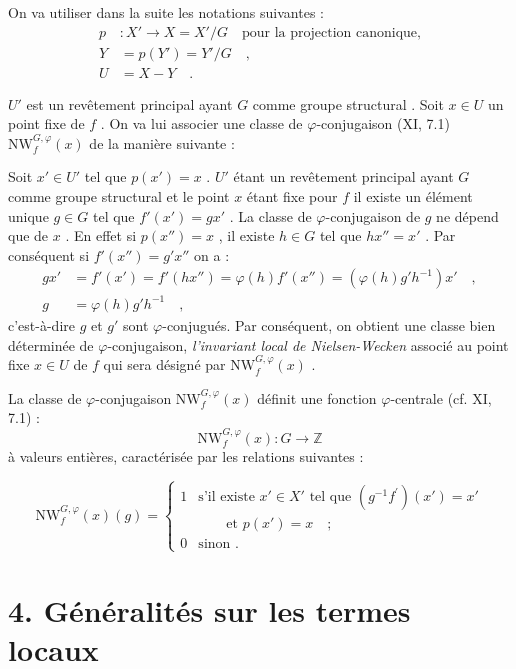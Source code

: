 \documentclass[11pt]{article}
\providecommand{\bZ}{\mathbb Z}
\begin{document}
On va utiliser dans la suite les notations suivantes :
\begin{align*}
p &: X' \longrightarrow X = X'/G \quad \text{pour la projection canonique,} \\
Y &= p(Y') = Y'/G \quad , \\
U &= X - Y \quad .
\end{align*}

$U'$ est un revêtement principal ayant $G$ comme groupe structural . Soit $x \in U$ un point fixe de $f$ . On va lui associer une classe de $\varphi$-conjugaison (XI, 7.1) $\mathrm{NW}_{f}^{G,\varphi}(x)$ de la manière suivante :

Soit $x' \in U'$ tel que $p(x') = x$ . $U'$ étant un revêtement principal ayant $G$ comme groupe structural et le point $x$ étant fixe pour $f$ il existe un élément unique $g \in G$ tel que $f'(x') = gx'$ . La classe de $\varphi$-conjugaison de $g$ ne dépend que de $x$ . En effet si $p(x'') = x$ , il existe $h \in G$ tel que $hx'' = x'$ . Par conséquent si $f'(x'') = g'x''$ on a :
\begin{align*}
gx' &= f'(x') = f'(hx'') = \varphi(h)f'(x'') = (\varphi(h)g'h^{-1})x' \quad , \\
g &= \varphi(h)g'h^{-1} \quad ,
\end{align*}
c'est-à-dire $g$ et $g'$ sont $\varphi$-conjugués. Par conséquent, on obtient une classe bien déterminée de $\varphi$-conjugaison, \emph{l'invariant local de Nielsen-Wecken} associé au point fixe $x \in U$ de $f$ qui sera désigné par $\mathrm{NW}_{f}^{G,\varphi}(x)$ .

La classe de $\varphi$-conjugaison $\mathrm{NW}_{f}^{G,\varphi}(x)$ définit une fonction $\varphi$-centrale (cf. XI, 7.1) :
\[
\mathrm{NW}_{f}^{G,\varphi}(x) : G \longrightarrow \bZ
\]
à valeurs entières, caractérisée par les relations suivantes :

\begin{equation}\tag{3.1}
\mathrm{NW}_{f}^{G,\varphi}(x)(g) = \begin{cases} 1 & \text{s'il existe } x' \in X' \text{ tel que } (g^{-1}f^{\prime})(x') = x' \\ & \qquad \text{et } p(x') = x \quad ; \\ 0 & \text{sinon .} \end{cases}
\end{equation}

\section*{4. Généralités sur les termes locaux}
\end{document}
